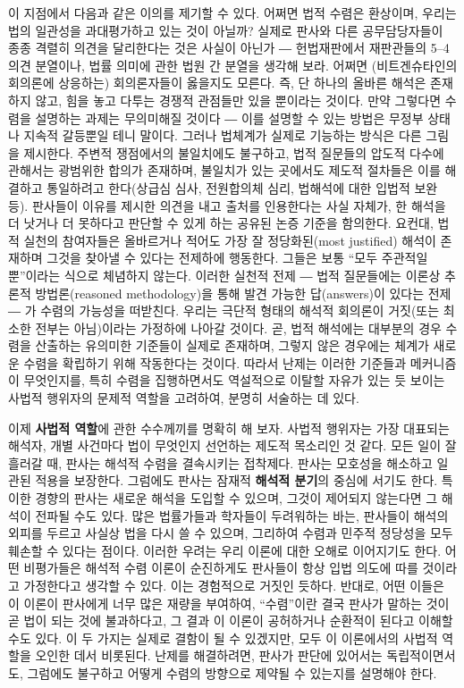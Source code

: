 \documentclass[12pt,a4paper]{article}
\begin{document}
이 지점에서 다음과 같은 이의를 제기할 수 있다. 어쩌면 법적 수렴은
환상이며, 우리는 법의 일관성을 과대평가하고 있는 것이 아닐까? 실제로
판사와 다른 공무담당자들이 종종 격렬히 의견을 달리한다는 것은 사실이
아닌가 ― 헌법재판에서 재판관들의 5--4 의견 분열이나, 법률 의미에 관한
법원 간 분열을 생각해 보라. 어쩌면 (비트겐슈타인의 회의론에 상응하는)
회의론자들이 옳을지도 모른다. 즉, \textsf{단 하나의 올바른 해석은 존재하지
않고}, 힘을 놓고 다투는 경쟁적 관점들만 있을 뿐이라는 것이다. 만약
그렇다면 수렴을 설명하는 과제는 무의미해질 것이다 ― 이를 설명할 수 있는
방법은 무정부 상태나 지속적 갈등뿐일 테니 말이다. 그러나 법체계가 실제로
기능하는 방식은 다른 그림을 제시한다. 주변적 쟁점에서의 불일치에도
불구하고, 법적 질문들의 압도적 다수에 관해서는 광범위한 합의가 존재하며,
불일치가 있는 곳에서도 제도적 절차들은 이를 해결하고 통일하려고
한다(상급심 심사, 전원합의체 심리, 법해석에 대한 입법적 보완 등).
판사들이 이유를 제시한 의견을 내고 출처를 인용한다는 사실 자체가, 한
해석을 더 낫거나 더 못하다고 판단할 수 있게 하는 공유된 논증 기준을
함의한다. 요컨대, 법적 실천의 참여자들은 올바르거나 적어도 \textsf{가장 잘
정당화된(most justified)} 해석이 존재하며 그것을 찾아낼 수 있다는
전제하에 행동한다. 그들은 보통 ``모두 주관적일 뿐''이라는 식으로
체념하지 않는다. 이러한 실천적 전제 ― 법적 질문들에는 이론상 추론적
방법론(reasoned methodology)을 통해 발견 가능한 \textsf{답(answers)}이
있다는 전제 ― 가 수렴의 가능성을 떠받친다. 우리는 극단적 형태의 해석적
회의론이 거짓(또는 최소한 전부는 아님)이라는 가정하에 나아갈 것이다. 곧,
법적 해석에는 대부분의 경우 수렴을 산출하는 유의미한 기준들이
\textsf{실제로} 존재하며, 그렇지 않은 경우에는 체계가 새로운 수렴을
확립하기 위해 작동한다는 것이다. 따라서 난제는 이러한 기준들과
메커니즘이 무엇인지를, 특히 수렴을 집행하면서도 역설적으로 이탈할 자유가
있는 듯 보이는 사법적 행위자의 문제적 역할을 고려하여, 분명히 서술하는
데 있다.

이제 \textbf{사법적 역할}에 관한 수수께끼를 명확히 해 보자. 사법적
행위자는 가장 대표되는 \textsf{해석자}, 개별 사건마다 법이 무엇인지
선언하는 제도적 목소리인 것 같다. 모든 일이 잘 흘러갈 때, 판사는 해석적
수렴을 결속시키는 접착제다. 판사는 모호성을 해소하고 일관된 적용을
보장한다. 그럼에도 판사는 잠재적 \textbf{해석적 분기}의 중심에 서기도
한다. 특이한 경향의 판사는 새로운 해석을 도입할 수 있으며, 그것이
제어되지 않는다면 그 해석이 전파될 수도 있다. 많은 법률가들과 학자들이
두려워하는 바는, 판사들이 해석의 외피를 두르고 사실상 법을 다시 쓸 수
있으며, 그리하여 수렴과 민주적 정당성을 모두 훼손할 수 있다는 점이다.
이러한 우려는 우리 이론에 대한 오해로 이어지기도 한다. 어떤 비평가들은
해석적 수렴 이론이 순진하게도 판사들이 \textsf{항상} 입법 의도에 따를
것이라고 가정한다고 생각할 수 있다. 이는 경험적으로 거짓인 듯하다.
반대로, 어떤 이들은 이 이론이 판사에게 너무 많은 재량을 부여하여,
``수렴''이란 결국 판사가 말하는 것이 곧 법이 되는 것에 불과하다고, 그
결과 이 이론이 공허하거나 순환적이 된다고 이해할 수도 있다. 이 두 가지는
실제로 결함이 될 수 있겠지만, 모두 이 이론에서의 사법적 역할을 오인한
데서 비롯된다. 난제를 해결하려면, 판사가 판단에 있어서는 독립적이면서도,
\textsf{그럼에도 불구하고} 어떻게 수렴의 방향으로 제약될 수 있는지를
설명해야 한다.
\end{document}
